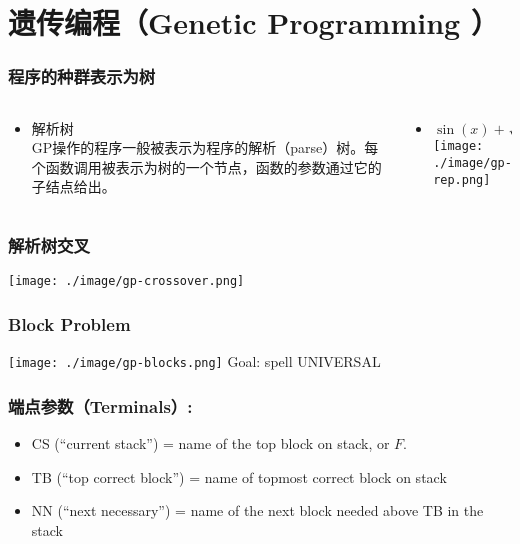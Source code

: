 \documentclass{beamer}
\begin{document}
\section{遗传编程（Genetic Programming ）}
\label{sec-6}
\begin{frame}
\frametitle{程序的种群表示为树}
\label{sec-6-1}
\begin{columns}
\begin{column}{0.3\textwidth}
\begin{itemize}

\item 解析树\\
\label{sec-6-1-1}%
GP操作的程序一般被表示为程序的解析（parse）树。每个函数调用被表示为树的一个节点，函数的参数通过它的子结点给出。

\end{itemize} %
\end{column}
\begin{column}{0.7\textwidth}
\begin{itemize}

\item $\sin(x) + \sqrt{x^{2} + y}$\\
\label{sec-6-1-2}%
\texttt{[image: ./image/gp-rep.png]}


\end{itemize} %
\end{column}
\end{columns}
\end{frame}
\begin{frame}
\frametitle{解析树交叉}
\label{sec-6-2}

\texttt{[image: ./image/gp-crossover.png]}
\end{frame}
\begin{frame}
\frametitle{Block Problem}
\label{sec-6-3}


\texttt{[image: ./image/gp-blocks.png]}
Goal: spell UNIVERSAL
\end{frame}
\begin{frame}
\frametitle{端点参数（Terminals）:}
\label{sec-6-4}

\begin{itemize}
\item CS (``current stack'') = name of the top block on stack, or $F$.
\item TB (``top correct block'') = name of topmost correct block on stack
\item NN (``next necessary'') = name of the next block needed above TB in the stack
\end{itemize}
\end{frame}
\end{document}
